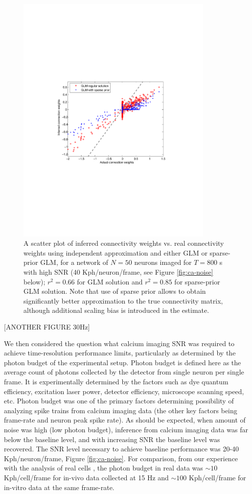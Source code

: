 \begin{figure}
\includegraphics[width=275pt]{../figs/Figure9_fluor_sparse_sol}
\caption{A scatter plot of inferred connectivity weights vs. real connectivity weights
using independent approximation and either GLM or sparse-prior GLM, 
for a network of $N=50$ neurons imaged for $T=800$ s
with high SNR (40 Kph/neuron/frame, see Figure \ref{fig:ca-noise} below); $r^2=0.66$ for GLM solution and $r^2=0.85$ for sparse-prior GLM solution. Note that use of sparse prior allows to obtain significantly better approximation to the true connectivity matrix, although additional scaling bias is introduced in the estimate.}
\label{fig:sparse-sol}
\end{figure}

[ANOTHER FIGURE 30Hz]

We then considered the question what calcium imaging SNR was required to achieve time-resolution performance limits, particularly as determined by the photon budget of the experimental setup. Photon budget is defined here as the average count of photons collected by the detector from single neuron per single frame. It is experimentally determined by the factors such as dye quantum efficiency, excitation laser power, detector efficiency, microscope scanning speed, etc. Photon budget was one of the primary factors determining possibility of analyzing spike trains from calcium imaging data (the other key factors being frame-rate and neuron peak spike rate).  As should be expected, when amount of noise was high (low photon budget), inference from calcium imaging data was far below the baseline level, and with increasing SNR the baseline level was recovered. The SNR level necessary to achieve baseline performance was 20-40 Kph/neuron/frame, Figure \ref{fig:ca-noise}.  For comparison, from our experience with the analysis of real cells \cite{Vogelstein2009}, the photon budget in real data was $\sim 10$ Kph/cell/frame for in-vivo data collected at 15 Hz and $\sim 100$ Kph/cell/frame for in-vitro data at the same frame-rate.

